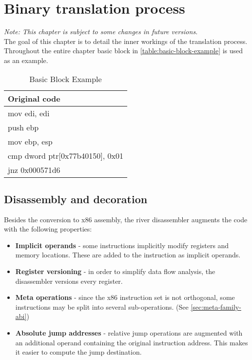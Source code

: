 \documentclass[12pt]{report}
\begin{document}
\chapter{Binary translation process}
\label{chapter:binary-translation-process}
\textit{Note: This chapter is subject to some changes in future versions.}\\
The goal of this chapter is to detail the inner workings of the translation process. Throughout the entire chapter basic block in \autoref{table:basic-block-example} is used as an example.\\
\begin{table}[H]
	\centering
	\begin{tabular}{| l |}
		\hline
		\textbf{Original code}\\ \hline
		mov edi, edi\\
		push ebp\\
		mov ebp, esp\\
		cmp dword ptr[0x77b40150], 0x01\\
		jnz 0x000571d6\\ \hline
	\end{tabular}
	\label{table:basic-block-example}
	\caption{Basic Block Example}
\end{table}

\section{Disassembly and decoration}
\label{sec:disassembly-and-decoration}
Besides the conversion to x86 assembly, the river disassembler augments the code with the following properties:
\begin{itemize}
	\item \textbf{Implicit operands} - some instructions implicitly modify registers and memory locations. These are added to the instruction as implicit operands.
	\item \textbf{Register versioning} - in order to simplify data flow analysis, the disassembler versions every register.
	\item \textbf{Meta operations} - since the x86 instruction set is not orthogonal, some instructions may be split into several sub-operations. (See \autoref{sec:meta-family-abi})
	\item \textbf{Absolute jump addresses} - relative jump operations are augmented with an additional operand containing the original instruction address. This makes it easier to compute the jump destination.
\end{itemize}
\end{document}
